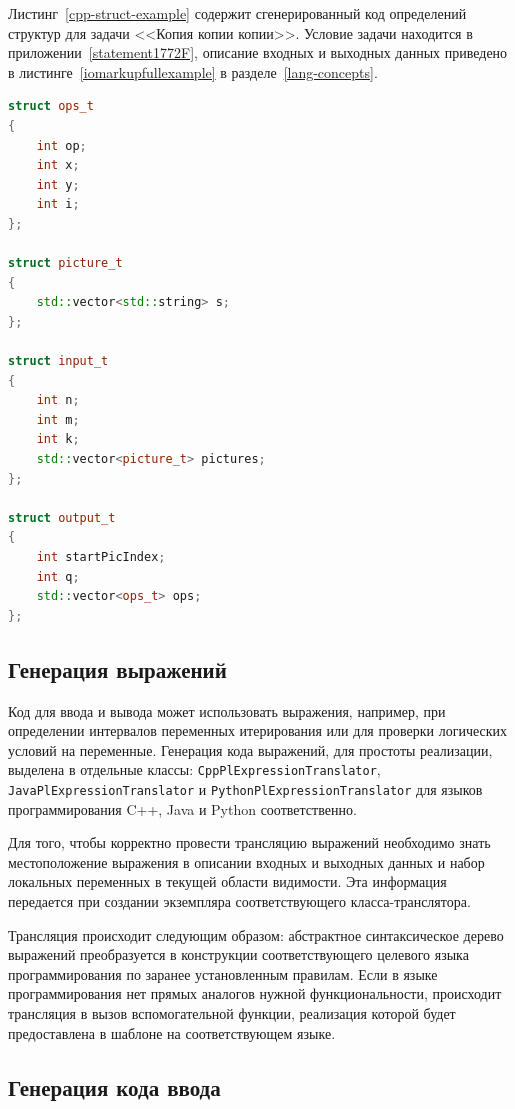 \documentclass[times,specification,annotation]{style/itmo-student-thesis/itmo-student-thesis}
\begin{document}
Листинг~\ref{cpp-struct-example} содержит сгенерированный код определений структур для задачи <<Копия копии копии>>. Условие задачи находится в приложении~\ref{statement1772F}, описание входных и выходных данных приведено в листинге~\ref{iomarkupfullexample} в разделе~\ref{lang-concepts}.

\begin{lstlisting}[float=!h,caption={Пример сгенерированного кода объявлений структур на языке C++},label={cpp-struct-example},language=c++]
struct ops_t
{
    int op;
    int x;
    int y;
    int i;
};

struct picture_t
{
    std::vector<std::string> s;
};

struct input_t
{
    int n;
    int m;
    int k;
    std::vector<picture_t> pictures;
};

struct output_t
{
    int startPicIndex;
    int q;
    std::vector<ops_t> ops;
};
\end{lstlisting}

\subsection{Генерация выражений}

Код для ввода и вывода может использовать выражения, например, при определении интервалов переменных итерирования или для проверки логических условий на переменные. Генерация кода выражений, для простоты реализации, выделена в отдельные классы: \texttt{CppPlExpressionTranslator}, \texttt{JavaPlExpressionTranslator} и \texttt{PythonPlExpressionTranslator} для языков программирования C++, Java и Python соответственно.

Для того, чтобы корректно провести трансляцию выражений необходимо знать местоположение выражения в описании входных и выходных данных и набор локальных переменных в текущей области видимости. Эта информация передается при создании экземпляра соответствующего класса-транслятора.

Трансляция происходит следующим образом: абстрактное синтаксическое дерево выражений преобразуется в конструкции соответствующего целевого языка программирования по заранее установленным правилам. Если в языке программирования нет прямых аналогов нужной функциональности, происходит трансляция в вызов вспомогательной функции, реализация которой будет предоставлена в шаблоне на соответствующем языке.

\subsection{Генерация кода ввода}
\end{document}
